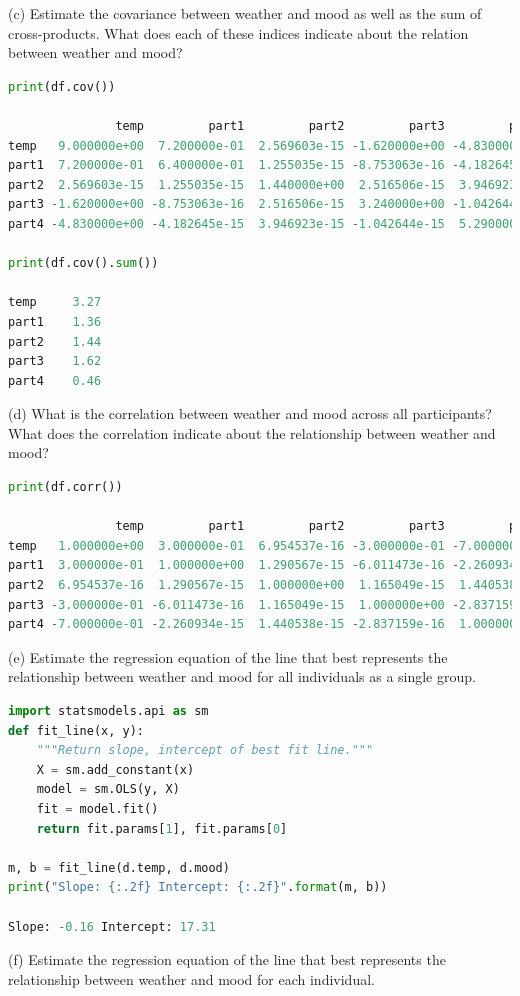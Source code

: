 \documentclass[onecolumn,10pt]{jhwhw}
\begin{document}
(c) Estimate the covariance between weather and mood as well as the sum of cross-products. What does each of these indices indicate about the relation between weather and mood?
\begin{lstlisting}[language=Python]
print(df.cov())

               temp         part1         part2         part3         part4
temp   9.000000e+00  7.200000e-01  2.569603e-15 -1.620000e+00 -4.830000e+00
part1  7.200000e-01  6.400000e-01  1.255035e-15 -8.753063e-16 -4.182645e-15
part2  2.569603e-15  1.255035e-15  1.440000e+00  2.516506e-15  3.946923e-15
part3 -1.620000e+00 -8.753063e-16  2.516506e-15  3.240000e+00 -1.042644e-15
part4 -4.830000e+00 -4.182645e-15  3.946923e-15 -1.042644e-15  5.290000e+00

print(df.cov().sum())

temp     3.27
part1    1.36
part2    1.44
part3    1.62
part4    0.46
\end{lstlisting}
(d) What is the correlation between weather and mood across all participants? What does the correlation indicate about the relationship between weather and mood?
\begin{lstlisting}[language=Python]
print(df.corr())

               temp         part1         part2         part3         part4
temp   1.000000e+00  3.000000e-01  6.954537e-16 -3.000000e-01 -7.000000e-01
part1  3.000000e-01  1.000000e+00  1.290567e-15 -6.011473e-16 -2.260934e-15
part2  6.954537e-16  1.290567e-15  1.000000e+00  1.165049e-15  1.440538e-15
part3 -3.000000e-01 -6.011473e-16  1.165049e-15  1.000000e+00 -2.837159e-16
part4 -7.000000e-01 -2.260934e-15  1.440538e-15 -2.837159e-16  1.000000e+00
\end{lstlisting}
(e) Estimate the regression equation of the line that best represents the relationship between weather and mood for all individuals as a single group.
\begin{lstlisting}[language=Python]
import statsmodels.api as sm
def fit_line(x, y):
    """Return slope, intercept of best fit line."""
    X = sm.add_constant(x)
    model = sm.OLS(y, X)
    fit = model.fit()
    return fit.params[1], fit.params[0]

m, b = fit_line(d.temp, d.mood)
print("Slope: {:.2f} Intercept: {:.2f}".format(m, b))

Slope: -0.16 Intercept: 17.31
\end{lstlisting}
(f) Estimate the regression equation of the line that best represents the relationship between weather and mood for each individual.
\end{document}
